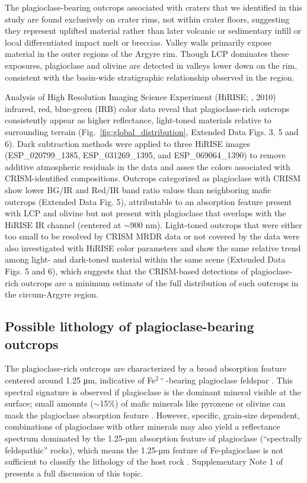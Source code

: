 \documentclass[12pt]{article}
\begin{document}
The plagioclase-bearing outcrops associated with craters that we identified in this study are found exclusively on crater rims, not within crater floors, suggesting they represent uplifted material rather than later volcanic or sedimentary infill or local differentiated impact melt or breccias. Valley walls primarily expose material in the outer regions of the Argyre rim. Though LCP dominates these exposures, plagioclase and olivine are detected in valleys lower down on the rim, consistent with the basin-wide stratigraphic relationship observed in the region.

Analysis of High Resolution Imaging Science Experiment (HiRISE; \citeauthor{McEwen2010}, 2010)  infrared, red, blue-green (IRB) color data reveal that plagioclase-rich outcrops consistently appear as higher reflectance, light-toned materials relative to surrounding terrain (Fig.~\ref{fig:global_distribution}, Extended Data Figs. 3, 5 and 6). Dark subtraction methods \citep{Tornabene2018} were applied to three HiRISE images (ESP\_020799\_1385, ESP\_031269\_1395, and ESP\_069064\_1390) to remove additive atmospheric residuals in the data and asses the colors associated with CRISM-identified compositions. Outcrops categorized as plagioclase with CRISM show lower BG/IR and Red/IR band ratio values than neighboring mafic outcrops (Extended Data Fig. 5), attributable to an absorption feature present with LCP and olivine but not present with plagioclase that overlaps with the HiRISE IR channel (centered at $\sim$900 nm). Light-toned outcrops that were either too small to be resolved by CRISM MRDR data or not covered by the data were also investigated with HiRISE color parameters and show the same relative trend among light- and dark-toned material within the same scene (Extended Data Figs. 5 and 6), which suggests that the CRISM-based detections of plagioclase-rich outcrops are a minimum estimate of the full distribution of such outcrops in the circum-Argyre region.

\subsection*{Possible lithology of plagioclase-bearing outcrops}

The plagioclase-rich outcrops are characterized by a broad absorption feature centered around 1.25 μm, indicative of Fe$^{2+}$-bearing plagioclase feldspar \citep{Adams1967, Adams1973, Adams1978}. This spectral signature is observed if plagioclase is the dominant mineral visible at the surface; small amounts ($\sim$15\%) of mafic minerals like pyroxene or olivine can mask the plagioclase absorption feature \citep{Crown1987, Pompilio2007, Serventi2013, Serventi2015, Cheek2014}. However, specific, grain-size dependent, combinations of plagioclase with other minerals may also yield a reflectance spectrum dominated by the 1.25-µm absorption feature of plagioclase (``spectrally feldspathic'' rocks), which means the 1.25-µm feature of Fe-plagioclase is not sufficient to classify the lithology of the host rock \citep{Rogers2015, Barthez2023, Vannier2024}. Supplementary Note 1 of \citet{Phillips2022} presents a full discussion of this topic.
\end{document}

